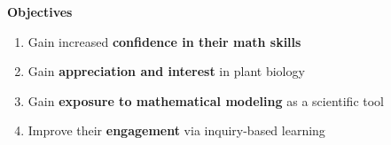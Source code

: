 \documentclass[final]{beamer}
\newlength{\onecolwid}
\newlength{\twocolwid}
\begin{document}
\begin{frame}[t]
\begin{columns}[t]
\begin{column}{\twocolwid}
\begin{columns}[t,totalwidth=\twocolwid] %

\begin{column}{\onecolwid} %

\vspace{-1cm}
\begin{block}{\textbf{\Large Objectives}}
{\large 
\begin{enumerate}
	\itemsep0em 
	\item Gain increased \textbf{confidence in their math skills}%
	\item Gain \textbf{appreciation and interest }in plant biology \cite{plantinterest1}%
	\item Gain\textbf{ exposure to mathematical modeling} as a scientific tool 
	\item Improve their \textbf{engagement }via inquiry-based learning \cite{math2}%
\end{enumerate}
}

\end{block}


\end{column} %

\begin{column}{\onecolwid} %


\end{column}
\end{columns}
\end{column}
\end{columns}
\end{frame}
\end{document}
